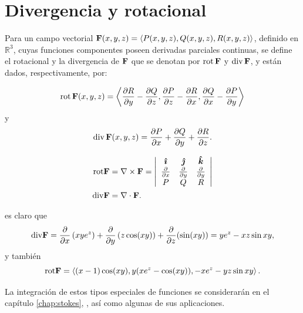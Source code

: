 \section{Divergencia y rotacional} \label{divergenciayrotacional}

Para un campo vectorial
${\bf F}(x,y,z)= \langle P(x,y,z),Q(x,y,z),R(x,y,z) \rangle$, definido en $\mathbb{R}^3$, cuyas funciones componentes poseen derivadas parciales continuas,
se define el rotacional y la divergencia de ${\bf F}$ que se denotan por $\operatorname{rot}{\bf F}$ y $\operatorname{div}{\bf F}$, y
están dados, respectivamente, por:

\[\operatorname{rot}{\bf F}(x,y,z)= \left\langle  \frac{\partial R}{\partial y}-\frac{\partial Q}{\partial z}, \frac{\partial P}{\partial z}-\frac{\partial R}{\partial x}, \frac{\partial Q}{\partial x}-\frac{\partial P}{\partial y} \right\rangle \]
y \[\operatorname{div}{\bf F}(x,y,z)= \frac{\partial P}{\partial x}+\frac{\partial Q}{\partial y}+\frac{\partial R}{\partial z}.\]

\begin{align*}
{\rm rot}{\bf F} &= \nabla \times{\bf F}  = \left\vert
\begin{array}{ccc}
\boldsymbol{\hat{\imath}} & \boldsymbol{\hat{\jmath}} &  \boldsymbol{\hat{k}} \\  \frac{\partial }{\partial x}  & \frac{\partial }{\partial y}
& \frac{\partial }{\partial y}  \\ P & Q & R
\end{array}\right\vert\\
{\rm div}{\bf F} &= \nabla \cdot{\bf F}.
\end{align*}

\begin{ejemplo}
 es claro que
\[{\rm div}{\bf F}=\frac{\partial }{\partial x} \left( xye^{z}\right) +\frac{\partial }{\partial y} \left( z\cos (xy) \right) +\frac{\partial }{\partial z}(\sin(xy))= ye^{z}-xz\sin xy,\] y también
\[{\rm rot}{\bf F} = \left\langle (x-1) \cos(xy),y(xe^{z}-\cos(xy)) ,-xe^{z}-yz\sin xy \right\rangle.\]
\end{ejemplo}
La integración de estos tipos especiales de funciones se considerarán en el capítulo \ref{chap:stokes}, ,
así como algunas de sus aplicaciones.
